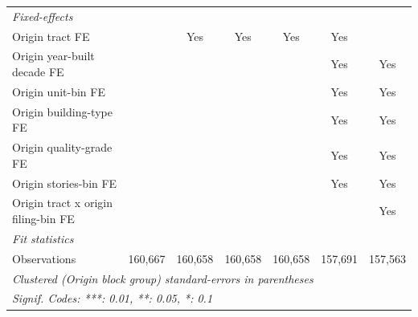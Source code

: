 \begin{tabular}{lcccccc}
   \midrule
   \emph{Fixed-effects}\\
   Origin tract FE                                 &          & Yes            & Yes            & Yes            & Yes                   & \\  
   Origin year-built decade FE                     &          &                &                &                & Yes                   & Yes\\  
   Origin unit-bin FE                              &          &                &                &                & Yes                   & Yes\\  
   Origin building-type FE                         &          &                &                &                & Yes                   & Yes\\  
   Origin quality-grade FE                         &          &                &                &                & Yes                   & Yes\\  
   Origin stories-bin FE                           &          &                &                &                & Yes                   & Yes\\  
   Origin tract x origin filing-bin FE             &          &                &                &                &                       & Yes\\  
   \midrule
   \emph{Fit statistics}\\
   Observations                                    & 160,667  & 160,658        & 160,658        & 160,658        & 157,691               & 157,563\\  
   \midrule \midrule
   \multicolumn{7}{l}{\emph{Clustered (Origin block group) standard-errors in parentheses}}\\
   \multicolumn{7}{l}{\emph{Signif. Codes: ***: 0.01, **: 0.05, *: 0.1}}\\
\end{tabular}
\par\endgroup
